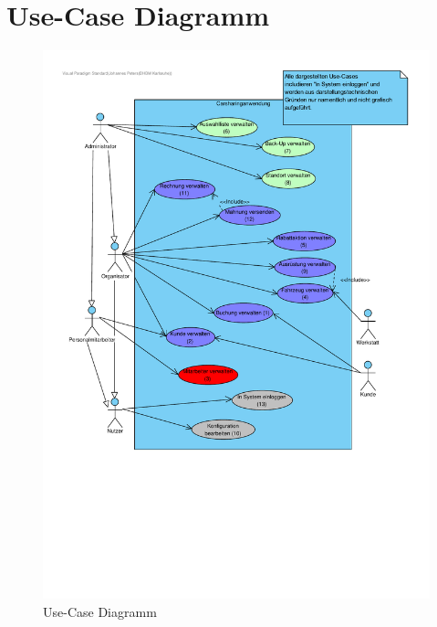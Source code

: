 \clearpage

\section{Use-Case Diagramm}

\begin{figure}[!ht]
    \centering
    \includegraphics[width=\textwidth, trim = 0cm 8cm 0cm 0cm]{Bilder/Diagramme/Use-Case Diagramm.pdf}
    \caption{Use-Case Diagramm}
    \label{img:use_case_overview}
\end{figure}


